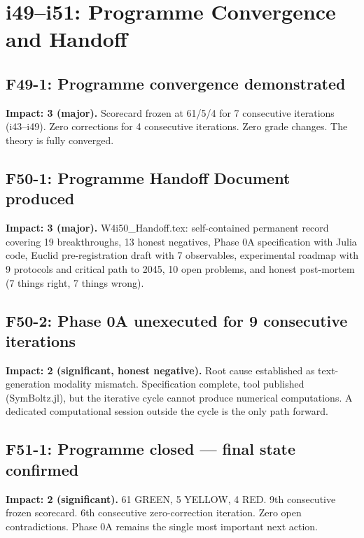\documentclass[11pt,a4paper]{article}
\begin{document}
\section{i49--i51: Programme Convergence and Handoff}
\label{sec:i49-51}

\subsection{F49-1: Programme convergence demonstrated}
\textbf{Impact: 3 (major).} Scorecard frozen at 61/5/4 for 7 consecutive iterations (i43--i49). Zero corrections for 4 consecutive iterations. Zero grade changes. The theory is fully converged.

\subsection{F50-1: Programme Handoff Document produced}
\textbf{Impact: 3 (major).} W4i50\_Handoff.tex: self-contained permanent record covering 19 breakthroughs, 13 honest negatives, Phase 0A specification with Julia code, Euclid pre-registration draft with 7 observables, experimental roadmap with 9 protocols and critical path to 2045, 10 open problems, and honest post-mortem (7 things right, 7 things wrong).

\subsection{F50-2: Phase 0A unexecuted for 9 consecutive iterations}
\textbf{Impact: 2 (significant, honest negative).} Root cause established as text-generation modality mismatch. Specification complete, tool published (SymBoltz.jl), but the iterative cycle cannot produce numerical computations. A dedicated computational session outside the cycle is the only path forward.

\subsection{F51-1: Programme closed --- final state confirmed}
\textbf{Impact: 2 (significant).} 61 GREEN, 5 YELLOW, 4 RED. 9th consecutive frozen scorecard. 6th consecutive zero-correction iteration. Zero open contradictions. Phase 0A remains the single most important next action.

\end{document}
